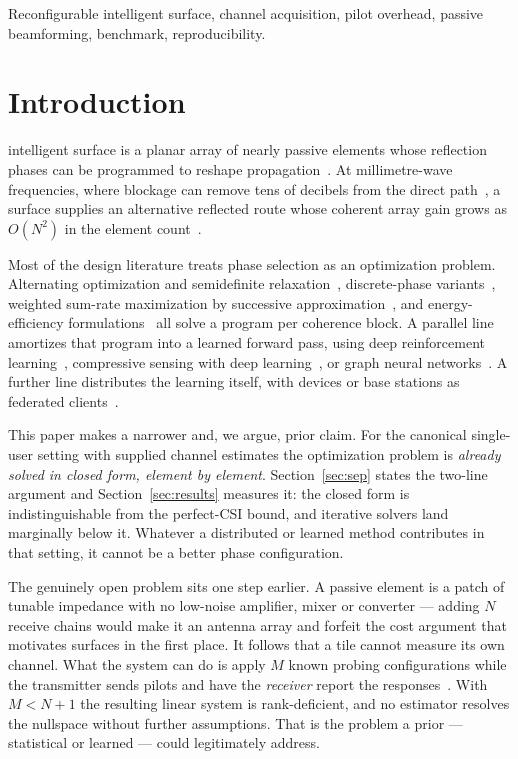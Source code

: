 \documentclass[journal]{IEEEtran}
\begin{document}
\begin{IEEEkeywords}
Reconfigurable intelligent surface, channel acquisition, pilot overhead, passive beamforming, benchmark, reproducibility.
\end{IEEEkeywords}

\section{Introduction}
\label{sec:intro}
 intelligent surface is a planar array of nearly passive elements whose reflection phases can be programmed to reshape propagation~\cite{direnzo2020,basar2019,wu2021tutorial}. At millimetre-wave frequencies, where blockage can remove tens of decibels from the direct path~\cite{rappaport2015}, a surface supplies an alternative reflected route whose coherent array gain grows as $O(N^2)$ in the element count~\cite{wu2019joint,bjornson2020}.

Most of the design literature treats phase selection as an optimization problem. Alternating optimization and semidefinite relaxation~\cite{wu2019joint,luo2010}, discrete-phase variants~\cite{wu2020discrete}, weighted sum-rate maximization by successive approximation~\cite{guo2020}, and energy-efficiency formulations~\cite{huang2019} all solve a program per coherence block. A parallel line amortizes that program into a learned forward pass, using deep reinforcement learning~\cite{huang2020drl}, compressive sensing with deep learning~\cite{taha2021}, or graph neural networks~\cite{shen2021gnn}. A further line distributes the learning itself, with devices or base stations as federated clients~\cite{elbir2022,mcmahan2017,kairouz2021}.

This paper makes a narrower and, we argue, prior claim. For the canonical single-user setting with supplied channel estimates the optimization problem is \emph{already solved in closed form, element by element}. Section~\ref{sec:sep} states the two-line argument and Section~\ref{sec:results} measures it: the closed form is indistinguishable from the perfect-CSI bound, and iterative solvers land marginally below it. Whatever a distributed or learned method contributes in that setting, it cannot be a better phase configuration.

The genuinely open problem sits one step earlier. A passive element is a patch of tunable impedance with no low-noise amplifier, mixer or converter --- adding $N$ receive chains would make it an antenna array and forfeit the cost argument that motivates surfaces in the first place. It follows that a tile cannot measure its own channel. What the system can do is apply $M$ known probing configurations while the transmitter sends pilots and have the \emph{receiver} report the responses~\cite{zheng2022survey,wang2020ce,he2020cascaded}. With $M<N+1$ the resulting linear system is rank-deficient, and no estimator resolves the nullspace without further assumptions. That is the problem a prior --- statistical or learned --- could legitimately address.
\end{document}
